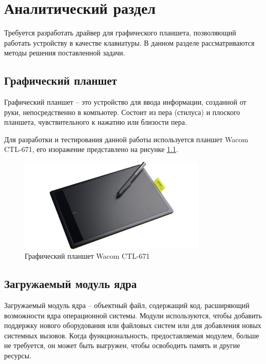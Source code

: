 \chapter{Аналитический раздел}
\label{cha:analysis}

Требуется разработать драйвер для графического планшета, позволяющий работать устройству в качестве клавиатуры. В данном разделе рассматриваются методы решения поставленной задачи.

\section{Графический планшет}

Графический планшет -- это устройство для ввода информации, созданной от руки, непосредственно в компьютер. Состоит из пера (стилуса) и плоского планшета, чувствительного к нажатию или близости пера.

Для разработки и тестирования данной работы используется планшет Wacom CTL-671, его изоражение представлено на рисунке \ref{fig:wacom}.

\begin{figure}[H]
    \centering
    \includegraphics[width=0.8\textwidth]{img/wacom.jpg}
    \caption{Графический планшет Wacom CTL-671}
    \label{fig:wacom}
\end{figure}

\section{Загружаемый модуль ядра}

Загружаемый модуль ядра -- объектный файл, содержащий код, расширяющий возможности ядра операционной системы. Модули используются, чтобы добавить поддержку нового оборудования или файловых систем или для добавления новых системных вызовов. Когда функциональность, предоставляемая модулем, больше не требуется, он может быть выгружен, чтобы освободить память и другие ресурсы.

